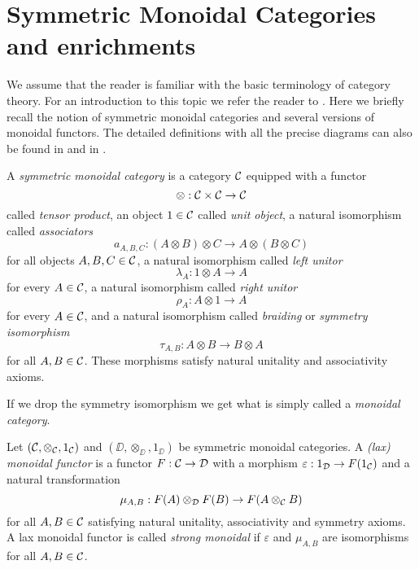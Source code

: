 \documentclass[Thesis.tex]{subfiles}
\begin{document}
\section{Symmetric Monoidal Categories and enrichments}\label{back1}

We assume that the reader is familiar with the basic terminology of category theory. For an introduction to this topic we refer the reader to \cite{maclane}. Here we briefly recall the notion of symmetric monoidal categories and several versions of monoidal functors. The detailed definitions with all the precise diagrams can also be found in \cite{maclane} and in \cite{borceux}.

\begin{defin}
A \emph{symmetric monoidal category} is a category ${\mathcal C}$ equipped with a functor 
\[\otimes:{\mathcal C}\times{\mathcal C}\to{\mathcal C}\]
called \emph{tensor product}, an object $1\in{\mathcal C}$
called \emph{unit object}, a natural isomorphism called \emph{associators}
\[a_{A,B,C} : (A \otimes B) \otimes C \to A \otimes (B \otimes C)\]
for all objects $A,B,C\in{\mathcal C}$, a natural isomorphism called \emph{left unitor}
\[\lambda_A:1\otimes A\to A\]
for every $A\in{\mathcal C}$, a natural isomorphism  called \emph{right unitor}
\[\rho_A:A\otimes 1\to A\]
for every $A\in{\mathcal C}$, and a natural isomorphism called \emph{braiding} or \emph{symmetry isomorphism}
\[\tau_{A,B}:A\otimes B \to B\otimes A\]
for all $A,B\in{\mathcal C}$. These morphisms satisfy natural unitality and associativity axioms.
\end{defin}

\begin{remark}
If we drop the symmetry isomorphism we get what is simply called a \emph{monoidal category}.
\end{remark}

\begin{defin}
Let $({\mathcal C},\otimes_{\mathcal C}, 1_{\mathcal C})$ and $(\DD, \otimes_\DD, 1_\DD)$ be symmetric monoidal categories. A \emph{(lax) monoidal functor} is a functor $F:{\mathcal C}\to{\mathcal D}$ with a morphism $\varepsilon:1_{\mathcal D}\to F(1_{\mathcal C})$
and a natural transformation
\[\mu_{A,B}:F(A)\otimes_{\mathcal D}  F(B)\to F(A\otimes_{\mathcal C} B)\]
for all $A,B\in{\mathcal C}$ satisfying natural unitality, associativity and symmetry axioms. A lax monoidal functor is called \emph{strong monoidal} if $\varepsilon$ and $\mu_{A,B}$ are isomorphisms for all $A,B\in{\mathcal C}$.
\end{defin}
\end{document}
